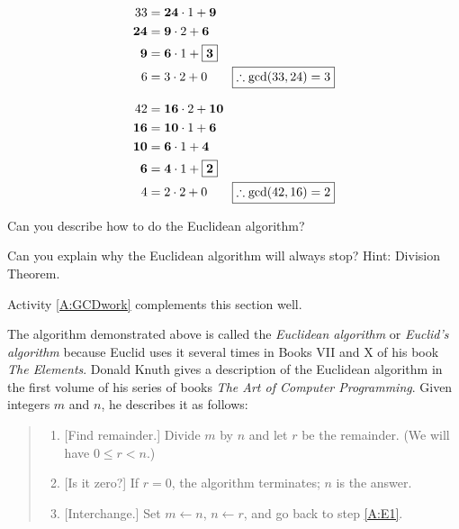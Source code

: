 \begin{align*}
33 &= \boldsymbol{24}\cdot 1 + \boldsymbol{9}\\
\boldsymbol{24} &= \boldsymbol{9} \cdot 2 + \boldsymbol{6}\\
\boldsymbol{9} &= \boldsymbol{6} \cdot 1 + \fbox{$\boldsymbol{3}$}\\
6 &= 3 \cdot 2 + 0 \qquad \fbox{$\therefore \gcd(33,24) = 3$} 
\end{align*}

\begin{align*}
42 &= \boldsymbol{16}\cdot 2 + \boldsymbol{10}\\
\boldsymbol{16} &= \boldsymbol{10} \cdot 1 + \boldsymbol{6}\\
\boldsymbol{10} &= \boldsymbol{6} \cdot 1 + \boldsymbol{4}\\
\boldsymbol{6} &= \boldsymbol{4} \cdot 1 + \fbox{$\boldsymbol{2}$}\\
4 &= 2 \cdot 2 + 0 \qquad \fbox{$\therefore \gcd(42,16) = 2$} 
\end{align*}

\begin{question}
Can you describe how to do the Euclidean algorithm?
\end{question}
\QM

\begin{question}
Can you explain why the Euclidean algorithm will always stop? Hint:
Division Theorem.
\end{question}
\QM



\begin{activitynote}
Activity \ref{A:GCDwork} complements this section well.  %
\end{activitynote}


The algorithm demonstrated above is called the \textit{Euclidean
  algorithm} or \textit{Euclid's algorithm} because
Euclid uses it several times in Books VII and X of his
book \textit{The Elements}. Donald Knuth gives a
description of the Euclidean algorithm in the first volume of his
series of books \textit{The Art of Computer Programming}. Given
integers $m$ and $n$, he describes it as follows:
\begin{quote}
\begin{enumerate} 
\item\label{A:E1} [Find remainder.] Divide $m$ by $n$ and let $r$ be the remainder. (We will have $0\le r< n$.)
\item{[Is it zero?]} If $r=0$, the algorithm terminates; $n$ is the answer.
\item{[Interchange.]} Set $m \leftarrow n$, $n \leftarrow r$, and go
  back to step \ref{A:E1}.
\end{enumerate}
\end{quote}

